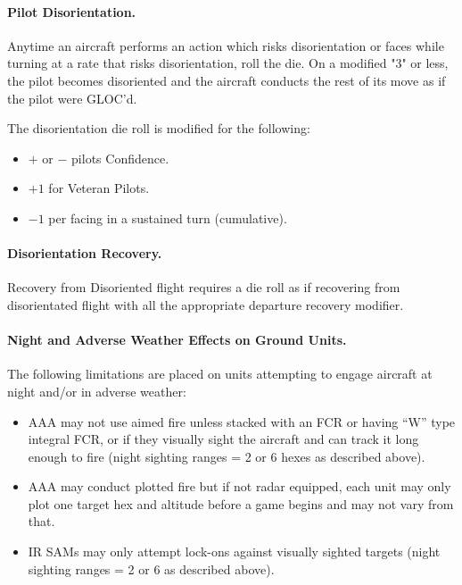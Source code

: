 \begin{advancedrules}
{\paragraph{Pilot Disorientation.} Anytime an aircraft performs an action which risks disorientation or faces while turning at a rate that risks disorientation, roll the die. On a modified "3" or less, the pilot becomes disoriented and the aircraft conducts the rest of its move as if the pilot were GLOC'd. 

The disorientation die roll is modified for the following:
\begin{itemize}
    \item $+$ or $-$ pilots Confidence.
    \item $+1$ for Veteran Pilots.
    \item $-1$ per facing in a sustained turn (cumulative).
\end{itemize}

\paragraph{Disorientation Recovery.} Recovery from Disoriented flight requires a die roll as if recovering from disorientated flight with all the appropriate departure recovery modifier.

\paragraph{Night and Adverse Weather Effects on Ground Units.} The following limitations are placed on units attempting to engage aircraft at night and/or in adverse weather:

\begin{itemize}

    \item AAA may not use aimed fire unless stacked with an FCR or having “W” type integral FCR, or if they visually sight the aircraft and can track it long enough to fire (night sighting ranges = 2 or 6 hexes as described above).

    \item AAA may conduct plotted fire but if not radar equipped, each unit may only plot one target hex and altitude before a game begins and may not vary from that.

    \item IR SAMs may only attempt lock-ons against visually sighted targets (night sighting ranges = 2 or 6 as described above).


\end{itemize}}
\end{advancedrules}
